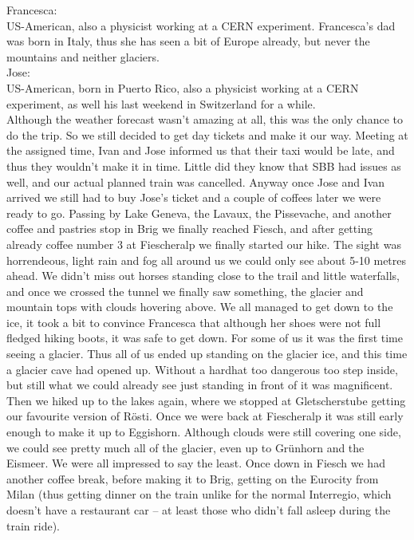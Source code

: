 Francesca:\\
US-American, also a physicist working at a CERN experiment. Francesca's dad was born in Italy, thus she has seen a bit of Europe already, but never the mountains and neither glaciers.\\

Jose:\\
US-American, born in Puerto Rico, also a physicist working at a CERN experiment, as well his last weekend in Switzerland for a while.\\

Although the weather forecast wasn't amazing at all, this was the only chance to do the trip. So we still decided to get day tickets and make it our way. Meeting at the assigned time, Ivan and Jose informed us that their taxi would be late, and thus they wouldn't make it in time. Little did they know that SBB had issues as well, and our actual planned train was cancelled. Anyway once Jose and Ivan arrived we still had to buy Jose's ticket and a couple of coffees later we were ready to go. Passing by Lake Geneva, the Lavaux, the Pissevache, and another coffee and pastries stop in Brig we finally reached Fiesch, and after getting already coffee number 3 at Fiescheralp we finally started our hike. The sight was horrendeous, light rain and fog all around us we could only see about 5-10 metres ahead. We didn't miss out horses standing close to the trail and little waterfalls, and once we crossed the tunnel we finally saw something, the glacier and mountain tops with clouds hovering above. We all managed to get down to the ice, it took a bit to convince Francesca that although her shoes were not full fledged hiking boots, it was safe to get down. For some of us it was the first time seeing a glacier. Thus all of us ended up standing on the glacier ice, and this time a glacier cave had opened up. Without a hardhat too dangerous too step inside, but still what we could already see just standing in front of it was magnificent. Then we hiked up to the lakes again, where we stopped at Gletscherstube getting our favourite version of R\"osti. Once we were back at Fiescheralp it was still early enough to make it up to Eggishorn. Although clouds were still covering one side, we could see pretty much all of the glacier, even up to Gr\"unhorn and the Eismeer. We were all impressed to say the least. Once down in Fiesch we had another coffee break, before making it to Brig, getting on the Eurocity from Milan (thus getting dinner on the train unlike for the normal Interregio, which doesn't have a restaurant car -- at least those who didn't fall asleep during the train ride).\\

